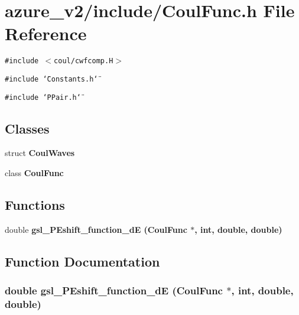 \section{azure\_\-v2/include/Coul\-Func.h File Reference}
\label{CoulFunc_8h}
{\tt \#include $<$coul/cwfcomp.H$>$}\par
{\tt \#include \char`\"{}Constants.h\char`\"{}}\par
{\tt \#include \char`\"{}PPair.h\char`\"{}}\par
\subsection*{Classes}
\begin{CompactItemize}
\item 
struct \bf{Coul\-Waves}
\item 
class \bf{Coul\-Func}
\end{CompactItemize}
\subsection*{Functions}
\begin{CompactItemize}
\item 
double \bf{gsl\_\-PEshift\_\-function\_\-d\-E} (\bf{Coul\-Func} $\ast$, int, double, double)
\end{CompactItemize}


\subsection{Function Documentation}
\subsubsection{\setlength{\rightskip}{0pt plus 5cm}double gsl\_\-PEshift\_\-function\_\-d\-E (\bf{Coul\-Func} $\ast$, int, double, double)}\label{CoulFunc_8h_1857cfc246c40cf3775d6bc5190e9621}


